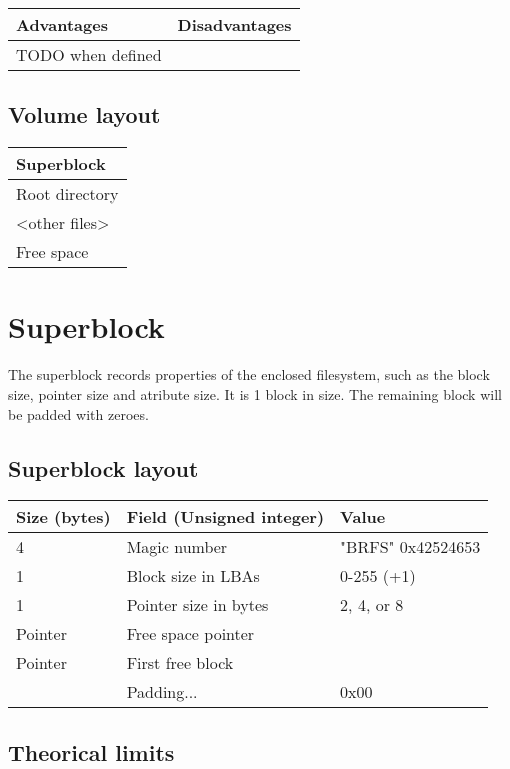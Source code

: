 \documentclass[]{article}
\begin{document}
	\begin{tabularx}{\textwidth}{X|X}
		\textbf{Advantages} & \textbf{Disadvantages} \\
		\hline
		TODO when defined
	\end{tabularx}

	\subsection{Volume layout}

	\begin{tabular}{|l|} 
		\hline
		Superblock \\ 
		\hline	
		Root directory \\
		\hline
		\textless other files\textgreater \\
		\hline
		Free space \\
		\hline
	\end{tabular}

	\section{Superblock}
	
	The superblock records properties of the enclosed filesystem, such as the block size, pointer size and atribute size. It is 1 block in size. The remaining block will be padded with zeroes.
	
	\subsection{Superblock layout}
	
	\begin{tabular}{|l|l|l|} 
		\hline
		\textbf{Size (bytes)} & \textbf{Field (Unsigned integer)} & \textbf{Value} \\ [0.5ex] 
		\hline
		4 & Magic number & "BRFS" 0x42524653  \\ 
		\hline
		1 & Block size in LBAs & 0-255 (+1) \\
		\hline
		1 & Pointer size in bytes & 2, 4, or 8 \\
		\hline
		Pointer & Free space pointer & \\
		\hline
		Pointer & First free block & \\
		\hline
		 & Padding... & 0x00 \\
		\hline	
	\end{tabular}

	\subsection{Theorical limits}
	
\end{document}
